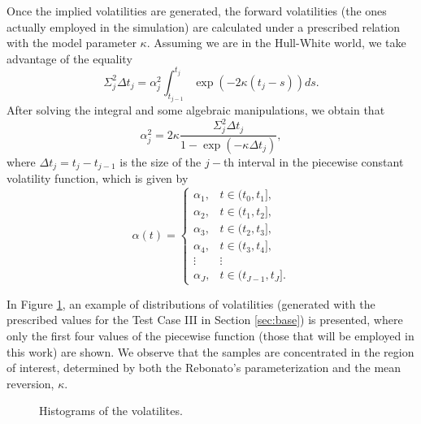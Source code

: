 \begin{itemize}
            Once the implied volatilities are generated, the forward volatilities (the ones actually employed in the simulation) are calculated under a prescribed relation with the model parameter $\kappa$.
            Assuming we are in the Hull-White world, we take advantage of the equality
            \begin{equation*}
                \Sigma_j^2 \Delta t_j = \alpha_j^2 \int_{t_{j-1}}^{t_j} \exp\left(-2\kappa(t_j - s)\right) ds.
            \end{equation*}
            After solving the integral and some algebraic manipulations, we obtain that
            \begin{equation*}
                \alpha_j^2 = 2\kappa\frac{\Sigma_j^2 \Delta t_j}{1 - \exp(-\kappa\Delta t_j)},
            \end{equation*}
            where $\Delta t_j = t_j - t_{j-1}$ is the size of the $j-$th interval in the piecewise constant volatility function, which is given by
            \begin{equation*}
                \alpha(t) = \left\{
                \begin{array}{cc}
                    \alpha_1, & t \in (t_0, t_1], \\
                    \alpha_2, & t \in (t_1, t_2], \\
                    \alpha_3, & t \in (t_2, t_3], \\
                    \alpha_4, & t \in (t_3, t_4], \\
                    \vdots & \vdots \\
                    \alpha_J, & t \in (t_{J-1}, t_J].
                \end{array}
                \right.
            \end{equation*}

            In Figure \ref{fig:Alpha_hist}, an example of distributions of volatilities (generated with the prescribed values for the Test Case III in Section \ref{sec:base}) is presented, where only the first four values of the piecewise function (those that will be employed in this work) are shown. We observe that the samples are concentrated in the region of interest, determined by both the Rebonato's parameterization and the mean reversion, $\kappa$.
            \begin{figure}[h!]
                \centering
                \caption{Histograms of the volatilites.}
                \label{fig:Alpha_hist}
            \end{figure}


\end{itemize}
